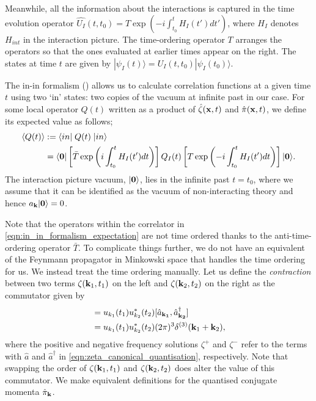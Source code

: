 Meanwhile, all the information about the interactions is captured in the time evolution operator $\hat{U_I}(t,t_0) = T\exp \left(-i\int_{t_0}^t H_I(t')dt'\right)$, where $H_I$ denotes $H_{int}$ in the interaction picture. The time-ordering operator $T$ arranges the operators so that the ones evaluated at earlier times appear on the right. The states at time $t$ are given by $|\psi_I(t)\rangle = U_I(t,t_0) |\psi_I(t_0)\rangle$.

The in-in formalism (\cite{Schwinger1961inin,Jordan1986inincosmo1,Calzetta1987inincosmo2}) allows us to calculate correlation functions at a given time $t$ using two `in' states: two copies of the vacuum at infinite past in our case. For some local operator $Q(t)$ written as a product of $\hat{\zeta}(\mathbf{x},t)$ and $\hat{\pi}(\mathbf{x},t)$, we define its expected value as follows;
\begin{align}
	\left< Q(t) \right> &:= \langle in |\;Q(t)\;| in \rangle \nonumber\\ &=  \langle\mathbf{0}| \left[ \bar{T} \exp \left( i \int_{t_0}^{t} H_I(t')dt \right) \right] Q_I(t) \left[ T \exp \left( -i \int_{t_0}^{t} H_I(t')dt \right) \right]  |\mathbf{0}\rangle. \label{eqn:in_in_formalism_expectation}
\end{align}
The interaction picture vacuum, $|\mathbf{0}\rangle$, lies in the infinite past $t=t_0$, where we assume that it can be identified as the vacuum of non-interacting theory and hence $a_\mathbf{k}|\mathbf{0}\rangle = 0$.

Note that the operators within the correlator in \eqref{eqn:in_in_formalism_expectation} are not time ordered thanks to the anti-time-ordering operator $\bar{T}$. To complicate things further, we do not have an equivalent of the Feynmann propagator in Minkowski space that handles the time ordering for us. We instead treat the time ordering manually. Let us define the \textit{contraction} between two terms $\zeta(\mathbf{k}_1,t_1)$ on the left and $\zeta(\mathbf{k}_2,t_2)$ on the right as the commutator given by
\begin{align}
	[ \zeta^+(\vv{k}_1,t_1) , \zeta^-(\vv{k}_2,t_2) ] &= u_{k_1}(t_1) u^*_{k_2}(t_2) [ \hat{a}_{\vv{k_1}}, \hat{a}_{\vv{k_2}}^\dagger] \\ &= u_{k_1}(t_1) u^*_{k_2}(t_2) (2\pi)^3 \delta^{(3)} (\vv{k}_1 + \vv{k}_2), 
\end{align}
where the positive and negative frequency solutions $\zeta^+$ and $\zeta^-$ refer to the terms with $\hat{a}$ and $\hat{a}^\dagger$ in \eqref{eqn:zeta_canonical_quantisation}, respectively. Note that swapping the order of $\zeta(\mathbf{k}_1,t_1)$ and $\zeta(\mathbf{k}_2,t_2)$ does alter the value of this commutator. We make equivalent definitions for the quantised conjugate momenta $\hat{\pi}_\mathbf{k}$.


